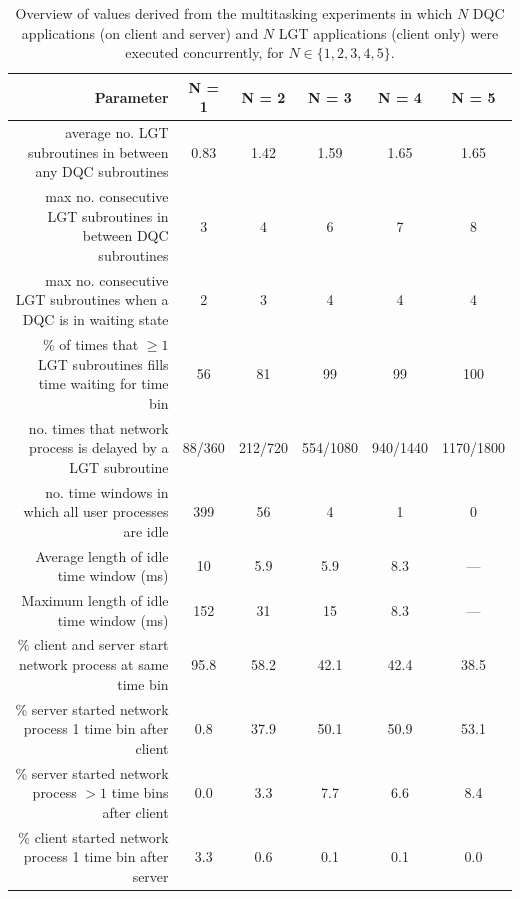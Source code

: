 \begin{table}
    \centering
    \begin{tabular}{|r|c|c|c|c|c|}
    \hline
    \textbf{Parameter} & \textbf{N = 1} & \textbf{N = 2} & \textbf{N = 3} & \textbf{N = 4} & \textbf{N = 5} \\ 
    \hline
    average no. \ac{LGT} subroutines in between any \ac{DQC} subroutines & 0.83 & 1.42 & 1.59 & 1.65 & 1.65 \\
    max no. consecutive \ac{LGT} subroutines in between \ac{DQC} subroutines & 3 & 4 & 6 & 7 & 8 \\
    max no. consecutive \ac{LGT} subroutines when a \ac{DQC} is in waiting state & 2 & 3 & 4 & 4 & 4 \\
    \% of times that $\geq 1$ \ac{LGT} subroutines fills time waiting for time bin  & 56 & 81 & 99 & 99 & 100 \\
    no. times that network process is delayed by a \ac{LGT} subroutine & 88/360 & 212/720 & 554/1080 & 940/1440 & 1170/1800 \\
    no. time windows in which all user processes are idle & 399 & 56 & 4 & 1 & 0 \\
    Average length of idle time window (ms) & 10 & 5.9 & 5.9 & 8.3 & --- \\
    Maximum length of idle time window (ms) & 152 & 31 & 15 & 8.3 & --- \\
    \% client and server start network process at same time bin & 95.8 & 58.2 & 42.1 & 42.4 & 38.5 \\
    \% server started network process 1 time bin after client & 0.8 & 37.9 & 50.1 & 50.9 & 53.1 \\
    \% server started network process $> 1$ time bins after client & 0.0 & 3.3 & 7.7 & 6.6 & 8.4 \\
    \% client started network process 1 time bin after server & 3.3 & 0.6 & 0.1 & 0.1 & 0.0 \\
    \hline
    \end{tabular}
    \caption{Overview of values derived from the multitasking experiments in which $N$ \ac{DQC} applications (on client and server) and $N$ \ac{LGT} applications (client only) were executed concurrently, for $N \in \{1, 2, 3, 4, 5\}$.}
    \label{tab:multitasking_numbers}
\end{table}


